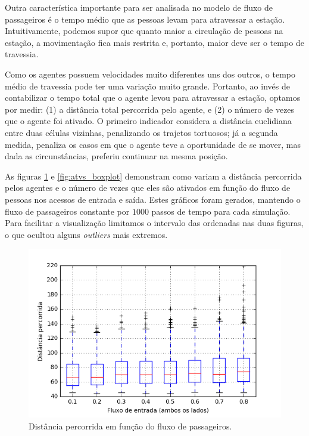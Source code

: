 \documentclass[preprint,12pt]{elsarticle}
\begin{document}
Outra característica importante para ser analisada no modelo de fluxo de passageiros é o tempo médio que as pessoas levam para atravessar a estação. Intuitivamente, podemos supor que quanto maior a circulação de pessoas na estação, a movimentação fica mais restrita e, portanto, maior deve ser o tempo de travessia.

Como os agentes possuem velocidades muito diferentes uns dos outros, o tempo médio de travessia pode ter uma variação muito grande. Portanto, ao invés de contabilizar o tempo total que o agente levou para atravessar a estação, optamos por medir: (1) a distância total percorrida pelo agente, e (2) o número de vezes que o agente foi ativado. O primeiro indicador considera a distância euclidiana entre duas células vizinhas, penalizando os trajetos tortuosos; já a segunda medida, penaliza os casos em que o agente teve a oportunidade de se mover, mas dada as circunstâncias, preferiu continuar na mesma posição.

As figuras \ref{fig:dists_boxplot} e \ref{fig:atvs_boxplot} demonstram como variam a distância percorrida pelos agentes e o número de vezes que eles são ativados em função do fluxo de pessoas nos acessos de entrada e saída. Estes gráficos foram gerados, mantendo o fluxo de passageiros constante por $1000$ passos de tempo para cada simulação. Para facilitar a visualização limitamos o intervalo das ordenadas nas duas figuras, o que ocultou alguns \textit{outliers} mais extremos.

\begin{figure}[H]
	\centering
	\includegraphics[totalheight=7cm]{figures/dist_boxplot.png}
	\caption{Distância percorrida em função do fluxo de passageiros.}
	\label{fig:dists_boxplot}
\end{figure}
\end{document}

